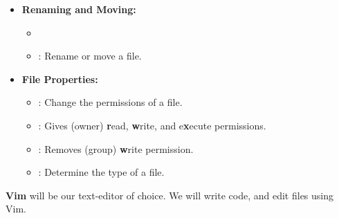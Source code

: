 \begin{Def}
\begin{itemize}
		\item \textbf{Renaming and Moving:}
		      \begin{itemize}
				  \item {}
			      \item {}: Rename or move a file.
		      \end{itemize}
		\item \textbf{File Properties:}
			  \begin{itemize}
			  \item {}: Change the permissions of a file.
			  \item {}: Gives  (owner) \textbf{r}ead, \textbf{w}rite, and e\textbf{x}ecute permissions. 
			  \item {}: Removes  (group) \textbf{w}rite permission.
			  \item {}: Determine the type of a file.
			  \end{itemize}
		
	\end{itemize}
	\vspace{1em}
\end{Def}

\newpage 
\noindent
\textbf{Vim} will be our text-editor of choice. We will write code, and edit files using Vim.

